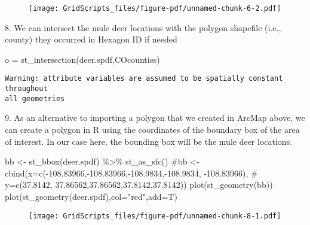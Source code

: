 \documentclass[
  letterpaper,
]{book}
\newenvironment{Shaded}{\begin{snugshade}}{\end{snugshade}}
\newcommand{\AttributeTok}[1]{\textcolor[rgb]{0.40,0.45,0.13}{#1}}
\newcommand{\CommentTok}[1]{\textcolor[rgb]{0.37,0.37,0.37}{#1}}
\newcommand{\FunctionTok}[1]{\textcolor[rgb]{0.28,0.35,0.67}{#1}}
\newcommand{\NormalTok}[1]{\textcolor[rgb]{0.00,0.23,0.31}{#1}}
\newcommand{\OtherTok}[1]{\textcolor[rgb]{0.00,0.23,0.31}{#1}}
\newcommand{\SpecialCharTok}[1]{\textcolor[rgb]{0.37,0.37,0.37}{#1}}
\newcommand{\StringTok}[1]{\textcolor[rgb]{0.13,0.47,0.30}{#1}}
\begin{document}
\begin{figure}[H]

{\centering \texttt{[image: GridScripts\_files/figure-pdf/unnamed-chunk-6-2.pdf]}

}

\end{figure}

8. We can intersect the mule deer locations with the polygon shapefile
(i.e., county) they occurred in Hexagon ID if needed

\begin{Shaded}
\begin{Highlighting}[]
\NormalTok{o }\OtherTok{=} \FunctionTok{st\_intersection}\NormalTok{(deer.spdf,COcounties)}
\end{Highlighting}
\end{Shaded}

\begin{verbatim}
Warning: attribute variables are assumed to be spatially constant throughout
all geometries
\end{verbatim}

9. As an alternative to importing a polygon that we created in ArcMap
above, we can create a polygon in R using the coordinates of the
boundary box of the area of interest. In our case here, the bounding box
will be the mule deer locations.

\begin{Shaded}
\begin{Highlighting}[]
\NormalTok{bb }\OtherTok{\textless{}{-}} \FunctionTok{st\_bbox}\NormalTok{(deer.spdf) }\SpecialCharTok{\%\textgreater{}\%} \FunctionTok{st\_as\_sfc}\NormalTok{()}
\CommentTok{\#bb \textless{}{-} cbind(x=c({-}108.83966,{-}108.83966,{-}108.9834,{-}108.9834, {-}108.83966), }
\CommentTok{\#  y=c(37.8142, 37.86562,37.86562,37.8142,37.8142))}
\FunctionTok{plot}\NormalTok{(}\FunctionTok{st\_geometry}\NormalTok{(bb))}
\FunctionTok{plot}\NormalTok{(}\FunctionTok{st\_geometry}\NormalTok{(deer.spdf),}\AttributeTok{col=}\StringTok{"red"}\NormalTok{,}\AttributeTok{add=}\NormalTok{T)}
\end{Highlighting}
\end{Shaded}

\begin{figure}[H]

{\centering \texttt{[image: GridScripts\_files/figure-pdf/unnamed-chunk-8-1.pdf]}

}

\end{figure}
\end{document}
